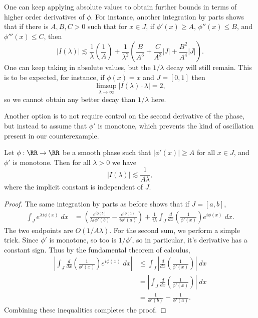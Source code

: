 One can keep applying absolute values to obtain further bounds in terms of higher order derivatives of $\phi$. For instance, another integration by parts shows that if there is $A,B,C > 0$ such that for $x \in J$, if $\phi'(x) \geq A$, $\phi''(x) \leq B$, and $\phi'''(x) \leq C$, then
%
\[ |I(\lambda)| \lesssim \frac{1}{\lambda} \left( \frac{1}{A} \right) + \frac{1}{\lambda^2} \left( \frac{B}{A^3} + \frac{C}{A^3} |J| + \frac{B^2}{A^4} |J| \right). \]
%
One can keep taking in absolute values, but the $1/\lambda$ decay will still remain. This is to be expected, for instance, if $\phi(x) = x$ and $J = [0,1]$ then
%
\[ \limsup_{\lambda \to \infty} |I(\lambda) \cdot \lambda| = 2, \]
%
so we cannot obtain any better decay than $1/\lambda$ here.

Another option is to not require control on the second derivative of the phase, but instead to assume that $\phi'$ is monotone, which prevents the kind of oscillation present in our counterexample. 

\begin{lemma}
  Let $\phi: \RR \to \RR$ be a smooth phase such that $|\phi'(x)| \geq A$ for all $x \in J$, and $\phi'$ is monotone. Then for all $\lambda > 0$ we have
  \[ |I(\lambda)| \lesssim \frac{1}{A \lambda}, \]
  where the implicit constant is independent of $J$.
\end{lemma}
\begin{proof}
  The same integration by parts as before shows that if $J = [a,b]$,
  \begin{align*}
    \int_J e^{\lambda i \phi(x)}\; dx &= \left( \frac{e^{i \phi(b)}}{\lambda i \phi'(b)} - \frac{e^{i \phi(a)}}{i \phi'(a)} \right) + \frac{1}{i\lambda} \int_J \frac{d}{dx} \left( \frac{1}{\phi'(x)} \right) e^{i \phi(x)}\; dx.
  \end{align*}
  The two endpoints are $O(1/A \lambda)$. For the second sum, we perform a simple trick. Since $\phi'$ is monotone, so too is $1/\phi'$, so in particular, it's derivative has a constant sign. Thus by the fundamental theorem of calculus,
  \begin{align*}
    \left| \int_J \frac{d}{dx} \left( \frac{1}{\phi'(x)} \right) e^{i \phi(x)}\; dx \right| &\leq \int_J \left| \frac{d}{dx} \left( \frac{1}{\phi'(x)} \right)  \right|\; dx\\
    &= \left| \int_J \frac{d}{dx} \left( \frac{1}{\phi'(x)} \right) \right|\; dx\\
    &= \frac{1}{\phi'(b)} - \frac{1}{\phi'(a)}.
  \end{align*}
  Combining these inequalities completes the proof.
\end{proof}


